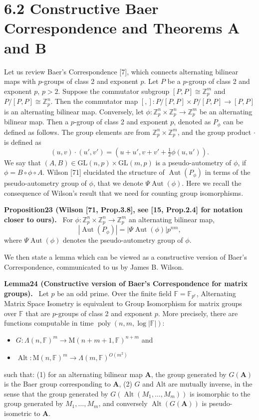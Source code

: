 \documentclass[10pt,a4paper]{article}
\newenvironment{authorclaim}[1]{\par\medskip\noindent\textbf{#1.}\ }{\par\medskip}
\begin{document}
\section*{6.2 Constructive Baer Correspondence and Theorems A and B}
Let us review Baer's Correspondence [7], which connects alternating bilinear maps with $p$-groups of class 2 and exponent $p$. Let $P$ be a $p$-group of class 2 and exponent $p$, $p>2$. Suppose the commutator subgroup $[P,P]\cong\mathbb Z_p^m$ and $P/[P,P]\cong\mathbb Z_p^n$. Then the commutator map $[,]:P/[P,P]\times P/[P,P]\to[P,P]$ is an alternating bilinear map. Conversely, let $\phi:\mathbb Z_p^n\times\mathbb Z_p^n\to\mathbb Z_p^m$ be an alternating bilinear map. Then a $p$-group of class 2 and exponent $p$, denoted as $P_\phi$ can be defined as follows. The group elements are from $\mathbb Z_p^n\times\mathbb Z_p^m$, and the group product $\cdot$ is defined as
\[(u,v)\cdot(u',v')=(u+u',v+v'+\tfrac12\phi(u,u')).\]
We say that $(A,B)\in\mathrm{GL}(n,p)\times\mathrm{GL}(m,p)$ is a pseudo-autometry of $\phi$, if $\phi=B\circ\phi\circ A$. Wilson [71] elucidated the structure of $\operatorname{Aut}(P_\phi)$ in terms of the pseudo-autometry group of $\phi$, that we denote $\Psi\operatorname{Aut}(\phi)$. Here we recall the consequence of Wilson's result that we need for counting group isomorphisms.
\begin{authorclaim}{Proposition23 (Wilson [71, Prop.3.8], see [15, Prop.2.4] for notation closer to ours)}
For $\phi:\mathbb Z_p^n\times\mathbb Z_p^n\to\mathbb Z_p^m$ an alternating bilinear map,
\[|\operatorname{Aut}(P_\phi)|=|\Psi\operatorname{Aut}(\phi)|p^{nm},\]
where $\Psi\operatorname{Aut}(\phi)$ denotes the pseudo-autometry group of $\phi$.
\end{authorclaim}
We then state a lemma which can be viewed as a constructive version of Baer's Correspondence, communicated to us by James B. Wilson.
\begin{authorclaim}{Lemma24 (Constructive version of Baer's Correspondence for matrix groups)}
Let $p$ be an odd prime. Over the finite field $\mathbb F=\mathbb F_{p^e}$, Alternating Matrix Space Isometry is equivalent to Group Isomorphism for matrix groups over $\mathbb F$ that are $p$-groups of class 2 and exponent $p$. More precisely, there are functions computable in time $\operatorname{poly}(n,m,\log|\mathbb F|)$:
\begin{itemize}
\item $G:\Lambda(n,\mathbb F)^m\to\mathrm M(n+m+1,\mathbb F)^{n+m}$ and
\item $\operatorname{Alt}:\mathrm M(n,\mathbb F)^m\to\Lambda(m,\mathbb F)^{O(m^2)}$
\end{itemize}
such that: (1) for an alternating bilinear map $\mathbf A$, the group generated by $G(\mathbf A)$ is the Baer group corresponding to $\mathbf A$, (2) $G$ and Alt are mutually inverse, in the sense that the group generated by $G(\operatorname{Alt}(M_1,\ldots,M_m))$ is isomorphic to the group generated by $M_1,\ldots,M_m$, and conversely $\operatorname{Alt}(G(\mathbf A))$ is pseudo-isometric to $\mathbf A$.
\end{authorclaim}
\end{document}
